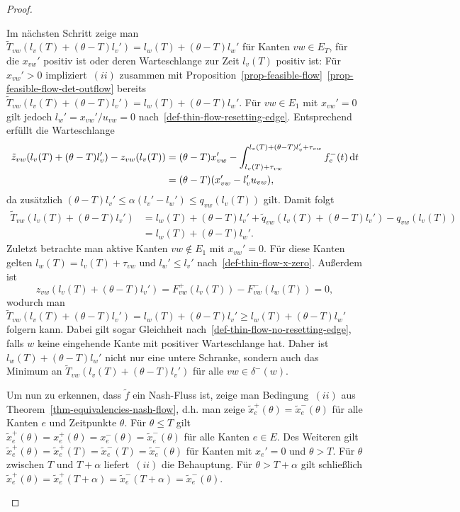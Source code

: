 \begin{proof}
\begin{description}[leftmargin=0cm, topsep=0cm, itemindent=0.5cm]
		Im nächsten Schritt zeige man $\tilde{T}_{vw}(l_v(T) + (\theta - T)l_v') = l_w(T) + (\theta - T) l_w'$ für Kanten $vw\in E_T$, für die $x_{vw}'$ positiv ist oder deren Warteschlange zur Zeit $l_v(T)$ positiv ist:
		Für $x_{vw}' > 0$ impliziert~$(ii)$ zusammen mit Proposition~\ref{prop-feasible-flow}~\ref{prop-feasible-flow-det-outflow} bereits $\tilde{T}_{vw}(l_v(T) + (\theta-T)l_v') = l_w(T) + (\theta - T) l_w'$.
		Für $vw\in E_1$ mit $x_{vw}'=0$ gilt jedoch $l_w' = x_{vw}' / u_{vw} = 0$ nach~\ref{def-thin-flow-resetting-edge}.
		Entsprechend erfüllt die Warteschlange
		\begin{align*}
		\tilde{z}_{vw}(l_v(T) + (\theta - T)l_v') - z_{vw}(l_v(T)) &= (\theta - T) x_{vw}' - \int_{l_v(T) + \tau_{vw}}^{l_v(T) + (\theta - T) l_v' + \tau_{vw}} f_e^-(t) \mathop{}\!\mathrm{d} t \\
		&= (\theta - T) (x_{vw}' -l_v' u_{vw}),
		\end{align*}
		da zusätzlich $(\theta-T) l_v' \leq \alpha (l_v' - l_w') \leq q_{vw}(l_v(T))$ gilt.
		Damit folgt
		\begin{align*}
		\tilde{T}_{vw}(l_v(T) + (\theta - T)l_v') &= l_w(T) + (\theta - T) l_v'  + \tilde{q}_{vw}(l_v(T) + (\theta - T)l_v')- q_{vw}(l_v(T)) \\
		&= l_w(T) + (\theta - T) l_w'.
		\end{align*}
		Zuletzt betrachte man aktive Kanten $vw\notin E_1$ mit $x_{vw}' = 0$.
		Für diese Kanten gelten $l_w(T) = l_v(T) + \tau_{vw}$ und $l_w' \leq l_v'$ nach~\ref{def-thin-flow-x-zero}.
		Außerdem ist 
		\[
		z_{vw}(l_v(T) + (\theta - T) l_v') = F_{vw}^+(l_v(T)) - F_{vw}^-(l_w(T)) = 0,
		\]
		wodurch man $\tilde{T}_{vw}(l_v(T) + (\theta - T) l_v') = l_w(T) + (\theta - T)l_v' \geq l_w(T) + (\theta - T) l_w'$ folgern kann.
		Dabei gilt sogar Gleichheit nach~\ref{def-thin-flow-no-resetting-edge}, falls $w$ keine eingehende Kante mit positiver Warteschlange hat.
		Daher ist $l_w(T)+(\theta - T) l_w'$ nicht nur eine untere Schranke, sondern auch das Minimum an $\tilde{T}_{vw}(l_v(T) + (\theta - T) l_v')$ für alle $vw\in \delta^-(w)$.
		
		Um nun zu erkennen, dass $\tilde{f}$ ein Nash-Fluss ist, zeige man Bedingung~$(ii)$ aus Theorem~\ref{thm-equivalencies-nash-flow}, d.h. man zeige $\tilde{x}_e^+(\theta) = \tilde{x}_e^-(\theta)$ für alle Kanten $e$ und Zeitpunkte $\theta$.
		Für $\theta \leq T$ gilt $\tilde{x}_e^+(\theta) = x_e^+(\theta) = x_e^-(\theta) = \tilde{x}_e^-(\theta)$ für alle Kanten $e\in E$.
		Des Weiteren gilt $\tilde{x}_e^+(\theta) = \tilde{x}_e^+(T) = \tilde{x}_e^-(T) = \tilde{x}_e^-(\theta)$ für Kanten mit $x_{e}' = 0$ und $\theta > T$.
		Für $\theta$ zwischen $T$ und $T+\alpha$ liefert~$(ii)$ die Behauptung.
		Für $\theta > T+\alpha$ gilt schließlich $\tilde{x}_e^+(\theta) = \tilde{x}_e^+(T + \alpha) = \tilde{x}_e^-(T+\alpha) = \tilde{x}_e^-(\theta)$.
\end{description}
\end{proof}


